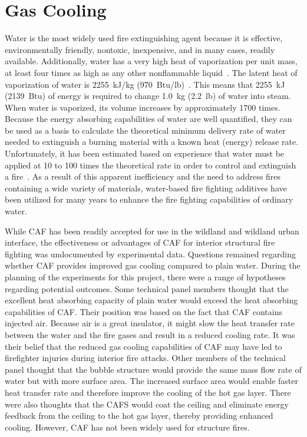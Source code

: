\documentclass[12pt,oneside]{book}
\begin{document}
\section{Gas Cooling}
\label{sec:Gas_Cooling_discuss}
 
Water is the most widely used fire extinguishing agent because it is effective, environmentally friendly, nontoxic, inexpensive, and in many cases, readily available. Additionally, water has a very high heat of vaporization per unit mass, at least four times as high as any other nonflammable liquid~\cite{NFPA}. The latent heat of vaporization of water is 2255~kJ/kg (970~Btu/lb)~\cite{NFPA}. This means that 2255~kJ (2139~Btu) of energy is required to change 1.0~kg (2.2~lb) of water into steam. When water is vaporized, its volume increases by approximately 1700 times. Because the energy absorbing capabilities of water are well quantified, they can be used as a basis to calculate the theoretical minimum delivery rate of water needed to extinguish a burning material with a known heat (energy) release rate. Unfortunately, it has been estimated based on experience that water must be applied at 10 to 100 times the theoretical rate in order to control and extinguish a fire~\cite{Friedman:2}. As a result of this apparent inefficiency and the need to address fires containing a wide variety of materials, water-based fire fighting additives have been utilized for many years to enhance the fire fighting capabilities of ordinary water.

While CAF has been readily accepted for use in the wildland and wildland urban interface, the effectiveness or advantages of CAF for interior structural fire fighting was undocumented by experimental data. Questions remained regarding whether CAF provides improved gas cooling compared to plain water. During the planning of the experiments for this project, there were a range of hypotheses regarding potential outcomes. Some technical panel members thought that the excellent heat absorbing capacity of plain water would exceed the heat absorbing capabilities of CAF. Their position was based on the fact that CAF contains injected air. Because air is a great insulator, it might slow the heat transfer rate between the water and the fire gases and result in a reduced cooling rate. It was their belief that the reduced gas cooling capabilities of CAF may have led to firefighter injuries during interior fire attacks. Other members of the technical panel thought that the bubble structure would provide the same mass flow rate of water but with more surface area. The increased surface area would enable faster heat transfer rate and therefore improve the cooling of the hot gas layer. There were also thoughts that the CAFS would coat the ceiling and eliminate energy feedback from the ceiling to the hot gas layer, thereby providing enhanced cooling. However, CAF has not been widely used for structure fires.
\end{document}
